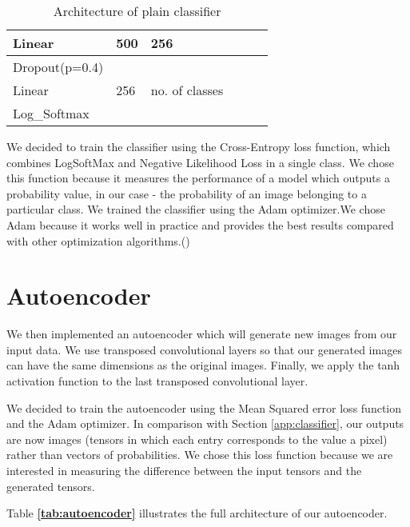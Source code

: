 \documentclass{l4proj}
\begin{document}
\begin{table}[ht!]
\begin{tabular}{|l|l|l|l|l|l|}
Linear          & 500                   & 256                    &                       &                 &                  \\ \hline
Dropout(p=0.4)  &                       &                        &                       &                 &                  \\ \hline
Linear          & 256                   & no. of classes         &                       &                 &                  \\ \hline
Log\_Softmax    &                       &                        &                       &                 &                  \\ \hline
\end{tabular}
\caption{Architecture of plain classifier}
\label{tab:classifier}
\end{table}

We decided to train the classifier using the Cross-Entropy loss function, which combines LogSoftMax and Negative Likelihood Loss in a single class. We chose this function because it measures the performance of a model which outputs a probability value, in our case - the probability of an image belonging to a particular class.
We trained the classifier using the Adam optimizer.We chose Adam because it works well in practice and provides the best results compared with other optimization algorithms.(\cite{optimoverview})


\section{Autoencoder}
We then implemented an autoencoder which will generate new images from our input data. We use transposed convolutional layers so that our generated images can have the same dimensions as the original images.
Finally, we apply the tanh activation function to the last transposed convolutional layer.

We decided to train the autoencoder using the Mean Squared error loss function and the Adam optimizer. In comparison with Section \ref{app:classifier}, our outputs are now images (tensors in which each entry corresponds to the value a pixel) rather than vectors of probabilities. We chose this loss function because we are interested in measuring the difference between the input tensors and the generated tensors.

Table \textbf{\ref{tab:autoencoder}} illustrates the full architecture of our autoencoder.
\end{document}
